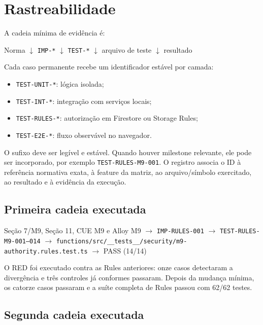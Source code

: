\section{Rastreabilidade}

A cadeia mínima de evidência é:

\begin{center}
Norma $\downarrow$ \texttt{IMP-*} $\downarrow$ \texttt{TEST-*}
$\downarrow$ arquivo de teste $\downarrow$ resultado
\end{center}

Cada caso permanente recebe um identificador estável por camada:

\begin{itemize}
  \item \texttt{TEST-UNIT-*}: lógica isolada;
  \item \texttt{TEST-INT-*}: integração com serviços locais;
  \item \texttt{TEST-RULES-*}: autorização em Firestore ou Storage Rules;
  \item \texttt{TEST-E2E-*}: fluxo observável no navegador.
\end{itemize}

O sufixo deve ser legível e estável. Quando houver milestone relevante, ele pode
ser incorporado, por exemplo \texttt{TEST-RULES-M9-001}. O registro associa o ID
à referência normativa exata, à feature da matriz, ao arquivo/símbolo exercitado,
ao resultado e à evidência da execução.

\subsection{Primeira cadeia executada}

\begin{center}
Seção 7/M9, Seção 11, CUE M9 e Alloy M9
$\rightarrow$ \texttt{IMP-RULES-001}
$\rightarrow$ \texttt{TEST-RULES-M9-001--014}
$\rightarrow$ \nolinkurl{functions/src/__tests__/security/m9-authority.rules.test.ts}
$\rightarrow$ PASS (14/14)
\end{center}

O RED foi executado contra as Rules anteriores: onze casos detectaram a
divergência e três controles já conformes passaram. Depois da mudança mínima,
os catorze casos passaram e a suíte completa de Rules passou com 62/62 testes.

\subsection{Segunda cadeia executada}

